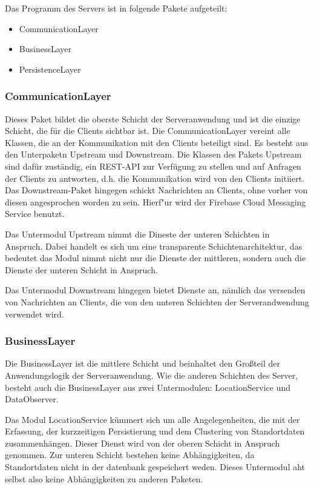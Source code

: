 Das Programm des Servers ist in folgende Pakete aufgeteilt:
\begin{itemize}
	\item CommunicationLayer
	\item BusinessLayer
	\item PersistenceLayer
\end{itemize}

\subsubsection{CommunicationLayer}
Dieses Paket bildet die oberste Schicht der Serveranwendung und ist die einzige Schicht, die für die Clients sichtbar ist. Die CommunicationLayer vereint alle Klassen, die an der Kommunikation mit den Clients beteiligt sind. Es besteht aus den Unterpaketn Upstream und Downstream. Die Klassen des Pakets Upstream sind dafür zuständig, ein REST-API zur Verfügung zu stellen und auf Anfragen der Clients zu antworten, d.h. die Kommunikation wird von den Clients initiiert. Das Downstream-Paket hingegen schickt Nachrichten an Clients, ohne vorher von diesen angesprochen worden zu sein. Hierf"ur wird der Firebase Cloud Messaging Service benutzt.

Das Untermodul Upstream nimmt die Dineste der unteren Schichten in Anspruch. Dabei handelt es sich um eine transparente Schichtenarchitektur, das bedeutet das Modul nimmt nicht nur die Dienste der mittleren, sondern auch die Dienste der unteren Schicht in Anspruch.

Das Untermodul Downstream hingegen bietet Dienste an, nämlich das versenden von Nachrichten an Clients, die von den unteren Schichten der Serverandwendung verwendet wird.

\subsubsection{BusinessLayer}
Die BusinessLayer ist die mittlere Schicht und beinhaltet den Großteil der Anwendungslogik der Serveranwendung. Wie die anderen Schichten des Server, besteht auch die BusinessLayer aus zwei Untermodulen: LocationService und DataObserver.

Das Modul LocationService kümmert sich um alle Angelegenheiten, die mit der Erfassung, der kurzzeitigen Persistierung und dem Clustering von Standortdaten zusammenhängen. Dieser Dienst wird von der oberen Schicht in Anspruch genommen. Zur unteren Schicht bestehen keine Abhängigkeiten, da Standortdaten nicht in der datenbank gespeichert weden. Dieses Untermodul aht selbst also keine Abhängigkeiten zu anderen Paketen.

